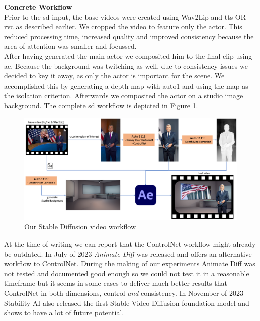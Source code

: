 \documentclass[
  a4paper,  %
  twoside,  %
  bibliography=totoc,
  headsepline,
  cleardoublepage=empty,
  parskip=half,
  draft=false
]{scrbook}
\begin{document}
\textbf{Concrete Workflow} \\
Prior to the \gls{sd} input, the base videos were created using Wav2Lip and \gls{tts} OR \gls{rvc} as described earlier. We cropped the video to feature only the actor. This reduced processing time, increased quality and improved consistency because the area of attention was smaller and focussed. \\
After having generated the main actor we composited him to the final clip using \gls{ae}. Because the background was  twitching as well, due to consistency issues we decided to key it away, as only the actor is important for the scene. We accomplished this by generating a depth map with \gls{auto1} and using the map as the isolation criterion. Afterwards we composited the actor on a studio image background. The complete \gls{sd} workflow is depicted in Figure \ref{fig:sd-full-workflow}. 

\begin{figure}[h]
  \centering
  \includegraphics[width=1\textwidth]{./graphics/images/diffusion/sd-workflow.png}
  \caption{Our Stable Diffusion video workflow}
  \label{fig:sd-full-workflow}
\end{figure}

At the time of writing we can report that the ControlNet workflow might already be outdated. In July of 2023 \textit{Animate Diff} was released and offers an alternative workflow to ControlNet. During the making of our experiments Animate Diff was not tested and documented good enough so we could not test it in a reasonable timeframe but it seems in some cases to deliver much better results that ControlNet in both dimensions, control \textit{and} consistency. In November of 2023 Stability AI also released the first Stable Video Diffusion foundation model and shows to have a lot of future potential. 
\end{document}
